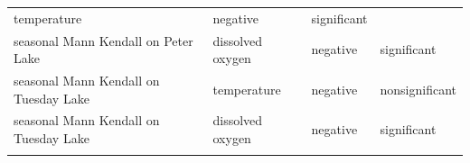 \documentclass[12pt,]{article}
\begin{document}
\begin{longtable}[]{@{}llll@{}}
\begin{minipage}[t]{0.22\columnwidth}
temperature\strut
\end{minipage} & \begin{minipage}[t]{0.14\columnwidth}\raggedright\strut
negative\strut
\end{minipage} & \begin{minipage}[t]{0.23\columnwidth}\raggedright\strut
significant\strut
\end{minipage}\tabularnewline
\begin{minipage}[t]{0.14\columnwidth}\raggedright\strut
seasonal Mann Kendall on Peter Lake\strut
\end{minipage} & \begin{minipage}[t]{0.22\columnwidth}\raggedright\strut
dissolved oxygen\strut
\end{minipage} & \begin{minipage}[t]{0.14\columnwidth}\raggedright\strut
negative\strut
\end{minipage} & \begin{minipage}[t]{0.23\columnwidth}\raggedright\strut
significant\strut
\end{minipage}\tabularnewline
\begin{minipage}[t]{0.14\columnwidth}\raggedright\strut
seasonal Mann Kendall on Tuesday Lake\strut
\end{minipage} & \begin{minipage}[t]{0.22\columnwidth}\raggedright\strut
temperature\strut
\end{minipage} & \begin{minipage}[t]{0.14\columnwidth}\raggedright\strut
negative\strut
\end{minipage} & \begin{minipage}[t]{0.23\columnwidth}\raggedright\strut
nonsignificant\strut
\end{minipage}\tabularnewline
\begin{minipage}[t]{0.14\columnwidth}\raggedright\strut
seasonal Mann Kendall on Tuesday Lake\strut
\end{minipage} & \begin{minipage}[t]{0.22\columnwidth}\raggedright\strut
dissolved oxygen\strut
\end{minipage} & \begin{minipage}[t]{0.14\columnwidth}\raggedright\strut
negative\strut
\end{minipage} & \begin{minipage}[t]{0.23\columnwidth}\raggedright\strut
significant\strut
\end{minipage}\tabularnewline
\begin{minipage}[t]{0.14\columnwidth}\raggedright\strut

\end{minipage}
\end{longtable}
\end{document}
